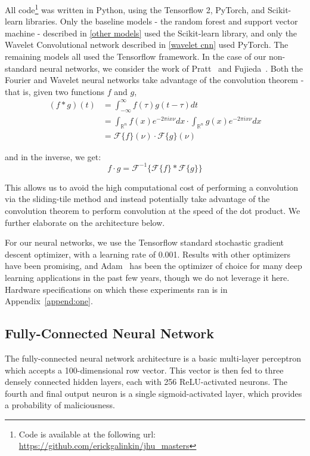 All code\footnote{Code is available at the following url: \url{https://github.com/erickgalinkin/jhu_masters}} was written in Python, using the Tensorflow 2, PyTorch, and Scikit-learn libraries.
Only the baseline models - the random forest and support vector machine - described in \ref{other models} used the Scikit-learn library, and only the Wavelet Convolutional network described in \ref{wavelet cnn} used PyTorch.
The remaining models all used the Tensorflow framework.
In the case of our non-standard neural networks, we consider the work of Pratt~\cite{pratt2017fcnn} and Fujieda~\cite{fujieda2017wavelet}.
Both the Fourier and Wavelet neural networks take advantage of the convolution theorem - that is, given two functions $f$ and $g$,
\begin{align*}
(f * g)(t) & = \int_{-\infty}^{\infty} f(\tau)g(t-\tau)dt \\
& = \int_{\mathbb{R}^n}f(x) e^{-2\pi i x \nu} dx	 \cdot \int_{\mathbb{R}^n}g(x) e^{-2\pi i x \nu} dx\\	
& = \mathcal{F}\{f\}(\nu) \cdot \mathcal{F}\{g\}(\nu)
\end{align*}

and in the inverse, we get:
$$f \cdot g = \mathcal{F}^{-1}\{\mathcal{F}\{f\} * \mathcal{F}\{g\}\}$$

This allows us to avoid the high computational cost of performing a convolution via the sliding-tile method and instead potentially take advantage of the convolution theorem to perform convolution at the speed of the dot product.
We further elaborate on the architecture below.

For our neural networks, we use the Tensorflow standard stochastic gradient descent optimizer, with a learning rate of 0.001.
Results with other optimizers have been promising, and Adam~\cite{kingma2014adam} has been the optimizer of choice for many deep learning applications in the past few years, though we do not leverage it here. 
Hardware specifications on which these experiments ran is in Appendix~\ref{append:one}.

\subsection{Fully-Connected Neural Network}
The fully-connected neural network architecture is a basic multi-layer perceptron which accepts a 100-dimensional row vector.
This vector is then fed to three densely connected hidden layers, each with 256 ReLU-activated neurons.
The fourth and final output neuron is a single sigmoid-activated layer, which provides a probability of maliciousness.

